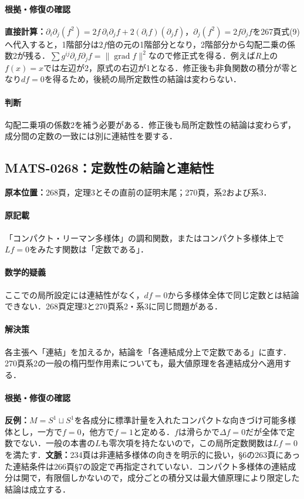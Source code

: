 \documentclass[a4paper,10pt]{ltjsarticle}
\begin{document}
\paragraph{根拠・修復の確認}\textbf{直接計算：}$\partial_i\partial_j(f^2)=2f\,\partial_i\partial_jf+2(\partial_if)(\partial_jf)$，$\partial_j(f^2)=2f\partial_jf$を267頁式(9)へ代入すると，1階部分は$2f$倍の元の1階部分となり，2階部分から勾配二乗の係数2が残る．$\sum g^{ij}\partial_if\partial_jf=\|\operatorname{grad}f\|^2$なので修正式を得る．例えば$R$上の$f(x)=x$では左辺が2，原式の右辺が1となる．修正後も非負関数の積分が零となり$df=0$を得るため，後続の局所定数性の結論は変わらない．

\paragraph{判断}勾配二乗項の係数2を補う必要がある．修正後も局所定数性の結論は変わらず，成分間の定数の一致には別に連結性を要する．


\subsection*{MATS-0268：定数性の結論と連結性}\label{math:MATS-0268}
\noindent\textbf{原本位置：}268頁，定理3とその直前の証明末尾；270頁，系2および系3．

\paragraph{原記載}「コンパクト・リーマン多様体」の調和関数，またはコンパクト多様体上で$Lf=0$をみたす関数は「定数である」．

\paragraph{数学的疑義}ここでの局所設定には連結性がなく，$df=0$から多様体全体で同じ定数とは結論できない．268頁定理3と270頁系2・系3に同じ問題がある．

\paragraph{解決策}各主張へ「連結」を加えるか，結論を「各連結成分上で定数である」に直す．270頁系2の一般の楕円型作用素についても，最大値原理を各連結成分へ適用する．

\paragraph{根拠・修復の確認}\textbf{反例：}$M=S^1\sqcup S^1$を各成分に標準計量を入れたコンパクトな向きづけ可能多様体とし，一方で$f=0$，他方で$f=1$と定める．$f$は滑らかで$\Delta f=0$だが全体で定数でない．一般の本書の$L$も零次項を持たないので，この局所定数関数は$Lf=0$を満たす．\textbf{文脈：}234頁は非連結多様体の向きを明示的に扱い，§6の263頁にあった連結条件は266頁§7の設定で再指定されていない．コンパクト多様体の連結成分は開で，有限個しかないので，成分ごとの積分又は最大値原理により限定した結論は成立する．
\end{document}
